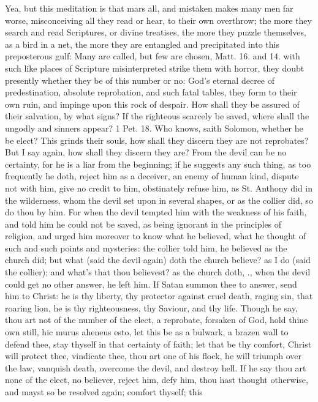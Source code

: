 {Yea, but this meditation is that mars all, and mistaken makes many men
far worse, misconceiving all they read or hear, to their own overthrow;
the more they search and read Scriptures, or divine treatises, the more
they puzzle themselves, as a bird in a net, the more they are entangled
and precipitated into this preposterous gulf: Many are called, but few
are chosen, Matt.  16. and  14. with such like places of
Scripture misinterpreted strike them with horror, they doubt presently
whether they be of this number or no: God's eternal decree of
predestination, absolute reprobation, and such fatal tables, they form
to their own ruin, and impinge upon this rock of despair. How shall
they be assured of their salvation, by what signs? If the righteous
scarcely be saved, where shall the ungodly and sinners appear? 1 Pet.
 18. Who knows, saith Solomon, whether he be elect? This grinds
their souls, how shall they discern they are not reprobates? But I say
again, how shall they discern they are? From the devil can be no
certainty, for he is a liar from the beginning; if he suggests any such
thing, as too frequently he doth, reject him as a deceiver, an enemy of
human kind, dispute not with him, give no credit to him, obstinately
refuse him, as St. Anthony did in the wilderness, whom the devil set
upon in several shapes, or as the collier did, so do thou by him. For
when the devil tempted him with the weakness of his faith, and told him
he could not be saved, as being ignorant in the principles of religion,
and urged him moreover to know what he believed, what he thought of
such and such points and mysteries: the collier told him, he believed
as the church did; but what (said the devil again) doth the church
believe? as I do (said the collier); and what's that thou believest? as
the church doth, \etc{}., when the devil could get no other answer, he left
him. If Satan summon thee to answer, send him to Christ: he is thy
liberty, thy protector against cruel death, raging sin, that roaring
lion, he is thy righteousness, thy Saviour, and thy life. Though he
say, thou art not of the number of the elect, a reprobate, forsaken of
God, hold thine own still, hic murus aheneus esto, let this be as a
bulwark, a brazen wall to defend thee, stay thyself in that certainty
of faith; let that be thy comfort, Christ will protect thee, vindicate
thee, thou art one of his flock, he will triumph over the law, vanquish
death, overcome the devil, and destroy hell. If he say thou art none of
the elect, no believer, reject him, defy him, thou hast thought
otherwise, and mayst so be resolved again; comfort thyself; this
}

